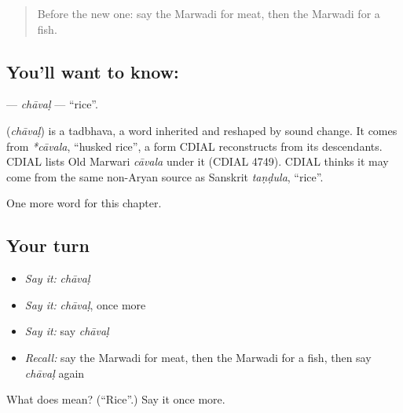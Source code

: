 \label{lesson:MW-C58-chaval}



\begin{quote}
Before the new one: say the Marwadi for meat, then the Marwadi for a fish.
\end{quote}

\subsection*{You'll want to know: }
\textbf{} — \emph{chāvaḷ} — \textquotedblleft{}rice\textquotedblright{}.

\begin{cousinweb}
\textbf{} (\emph{chāvaḷ}) is a tadbhava, a word inherited and reshaped by sound change. It comes from \emph{*cāvala}, \textquotedblleft{}husked rice\textquotedblright{}, a form CDIAL reconstructs from its descendants. CDIAL lists Old Marwari \emph{cāvala} under it (CDIAL 4749). CDIAL thinks it may come from the same non-Aryan source as Sanskrit \emph{taṇḍula}, \textquotedblleft{}rice\textquotedblright{}.
\end{cousinweb}

\begin{grammarlens}[title={What you've built}]
One more word for this chapter.
\end{grammarlens}

\subsection*{Your turn}
\begin{itemize}
\raggedright
  \item \emph{Say it:} \emph{chāvaḷ}
  \item \emph{Say it:} \emph{chāvaḷ}, once more
  \item \emph{Say it:} say \emph{chāvaḷ}
  \item \emph{Recall:} say the Marwadi for meat, then the Marwadi for a fish, then say \emph{chāvaḷ} again
\end{itemize}

\begin{tcolorbox}[breakable,colback=teal!4,colframe=teal!35!black,title={Before you move on}]
What does  mean? (\textquotedblleft{}Rice\textquotedblright{}.) Say it once more.
\end{tcolorbox}
